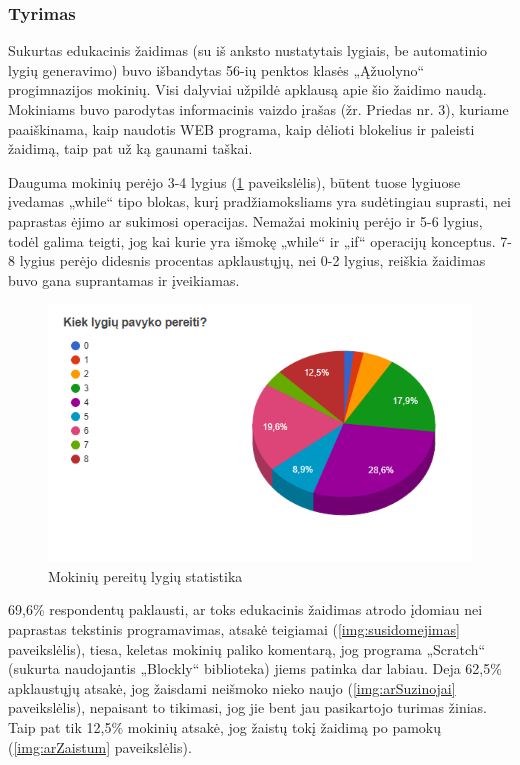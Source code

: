 \documentclass{VUMIFPSkursinis}
\begin{document}
\subsubsection{Tyrimas}
Sukurtas edukacinis žaidimas (su iš anksto nustatytais lygiais, be automatinio lygių generavimo) buvo išbandytas 56-ių penktos klasės „Ąžuolyno“ progimnazijos mokinių. Visi dalyviai užpildė apklausą apie šio žaidimo naudą. Mokiniams buvo parodytas informacinis vaizdo įrašas (žr. Priedas nr. 3), kuriame paaiškinama, kaip naudotis WEB programa, kaip dėlioti blokelius ir paleisti žaidimą, taip pat už ką gaunami taškai. 

Dauguma mokinių perėjo 3-4 lygius (\ref{img:pereitiLygiai} paveikslėlis), būtent tuose lygiuose įvedamas „while“ tipo blokas, kurį pradžiamoksliams yra sudėtingiau suprasti, nei paprastas ėjimo ar sukimosi operacijas. Nemažai mokinių perėjo ir 5-6 lygius, todėl galima teigti, jog kai kurie yra išmokę „while“ ir „if“ operacijų konceptus. 7-8 lygius perėjo didesnis procentas apklaustųjų, nei 0-2 lygius, reiškia žaidimas buvo gana suprantamas ir įveikiamas.

\begin{figure}[H]
\centering
\includegraphics[scale=0.8]{img/lygiuPerejimas.png}
\caption{Mokinių pereitų lygių statistika}
\label{img:pereitiLygiai}
\end{figure}

69,6\% respondentų paklausti, ar toks edukacinis žaidimas atrodo įdomiau nei paprastas tekstinis programavimas, atsakė teigiamai (\ref{img:susidomejimas} paveikslėlis), tiesa, keletas mokinių paliko komentarą, jog programa „Scratch“ (sukurta naudojantis „Blockly“ biblioteka) jiems patinka dar labiau. Deja 62,5\% apklaustųjų atsakė, jog žaisdami neišmoko nieko naujo (\ref{img:arSuzinojai} paveikslėlis), nepaisant to tikimasi, jog jie bent jau pasikartojo turimas žinias. Taip pat tik 12,5\% mokinių atsakė, jog žaistų tokį žaidimą po pamokų (\ref{img:arZaistum} paveikslėlis).
\end{document}
